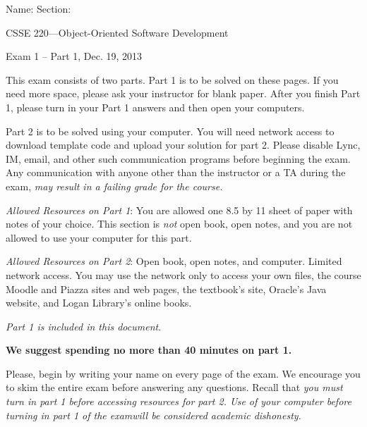 \documentclass[12pt,twoside]{article}
\newcommand{\fillInBlank}[1][0.5in]{\underline{\hspace{#1}}}
\begin{document}

\begin{flushright}
Name: \fillInBlank[3in] Section: \fillInBlank[1in]

\LARGE{CSSE 220---Object-Oriented Software Development}

\Large{Exam 1 -- Part 1, Dec. 19, 2013}
\end{flushright}

This exam consists of two parts.  Part 1 is to be solved on these pages. If you need more space, please ask your instructor for blank paper.  After you finish Part 1, please turn in your Part 1 answers and then open your computers.

Part 2 is to be solved using your computer.  You will need network access to download template code and upload your solution for part 2.  Please disable Lync, IM, email, and other such communication programs before beginning the exam.  Any communication with anyone other than the instructor or a TA during the exam, \emph{may result in a failing grade for the course.}

\emph{Allowed Resources on Part 1}:  You are allowed one 8.5 by 11 sheet of paper with notes of your choice.  This section is \emph{not} open book, open notes, and you are not allowed to use your computer for this part.  

\emph{Allowed Resources on Part 2}:  Open book, open notes, and computer.  Limited network access.  You may use the network only to access your own files, the course Moodle and Piazza sites and web pages, the textbook's site, Oracle's Java website, and Logan Library's online books. 

\emph{Part 1 is included in this document}.  

\begin{center}
\textbf{We suggest spending no more than 40 minutes on part 1.}
\end{center}

Please, begin by writing your name on every page of the exam. We encourage you to skim the
entire exam before answering any questions. Recall that \emph{you must turn in part 1 before accessing resources for part 2. Use of your computer before turning
in part 1 of the examwill be considered academic dishonesty.}


\vfill
\end{document}
